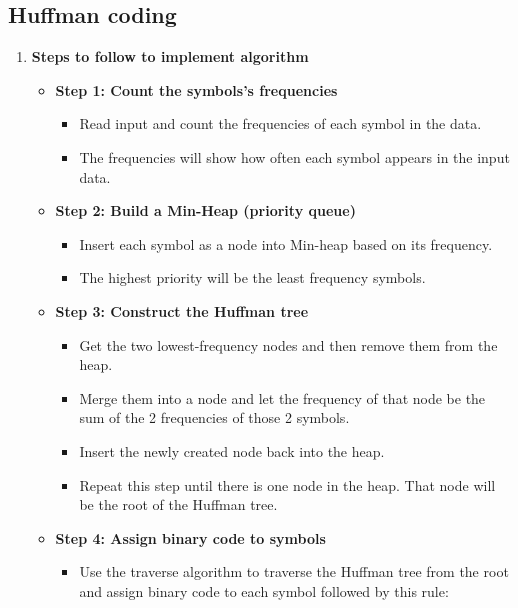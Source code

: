 \subsection{Huffman coding}
\begin{enumerate}[label=\textbf{\Alph*.}]
    \item \textbf{Steps to follow to implement algorithm}
        \begin{itemize}
            \item \textbf{Step 1: Count the symbols’s frequencies}
                \begin{itemize}
                    \item Read input and count the frequencies of each symbol in the data.
                    \item The frequencies will show how often each symbol appears in the input data.
                \end{itemize}
            \item \textbf{Step 2: Build a Min-Heap (priority queue)}
                \begin{itemize}
                    \item Insert each symbol as a node into Min-heap based on its frequency.
                    \item The highest priority will be the least frequency symbols.
                \end{itemize}
            \item \textbf{Step 3: Construct the Huffman tree}
                \begin{itemize}
                    \item Get the two lowest-frequency nodes and then remove them from the heap.
                    \item Merge them into a node and let the frequency of that node be the sum of the 2 frequencies of those 2 symbols.
                    \item Insert the newly created node back into the heap.
                    \item Repeat this step until there is one node in the heap. That node will be the root of the Huffman tree.
                \end{itemize}
            \item \textbf{Step 4: Assign binary code to symbols}
                \begin{itemize}
                    \item Use the traverse algorithm to traverse the Huffman tree from the root and assign binary code to each symbol followed by this rule:

\end{itemize}
\end{itemize}
\end{enumerate}

